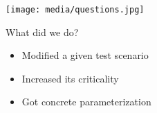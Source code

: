 \documentclass[aspectratio=169]{beamer}
\begin{document}
{%
\begin{frame}[plain]
    \centering
    \texttt{[image: media/questions.jpg]}
\end{frame}
}

\begin{frame}{What did we do?}
    \begin{itemize}[<+ (1)->]
        \item Modified a given test scenario
        \item Increased its criticality
        \item Got concrete parameterization
    \end{itemize}
\end{frame}
\end{document}
